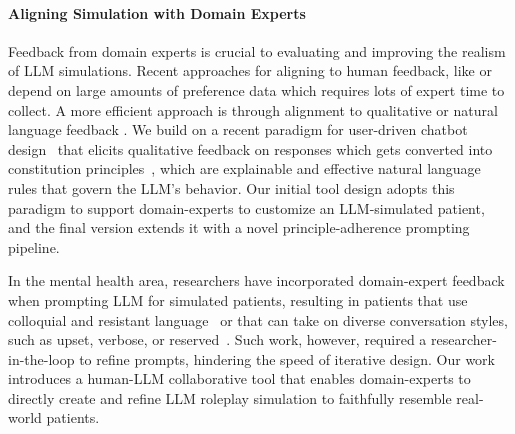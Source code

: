 \documentclass[11pt]{article}
\begin{document}
\paragraph{Aligning Simulation with Domain Experts}
Feedback from domain experts is crucial to evaluating and improving the realism of LLM simulations. Recent approaches for aligning to human feedback, like \citet{christiano2017deep} or \citet{rafailov2024direct} depend on large amounts of preference data which requires lots of expert time to collect. A more efficient approach is through alignment to qualitative or natural language feedback \cite{shi2022life}. 
We build on a recent paradigm for user-driven chatbot design~\cite{petridis2023constitutionmaker} that elicits qualitative feedback on responses which gets converted into constitution principles~\cite{bai2022constitutional}, which are explainable and effective natural language rules that govern the LLM's behavior.
Our initial tool design adopts this paradigm to support domain-experts to customize an LLM-simulated patient,
and the final version extends it with a novel principle-adherence prompting pipeline.

In the mental health area, researchers have incorporated domain-expert feedback when prompting LLM for simulated patients, resulting in patients that use colloquial and resistant language~\cite{chen2023llmempowered, stapleton2023seeing} or that can take on diverse conversation styles, such as upset, verbose, or reserved~\cite{wang2024patient}. 
Such work, however, required a researcher-in-the-loop to refine prompts, hindering the speed of iterative design.
Our work introduces a human-LLM collaborative tool that enables domain-experts to directly create and refine LLM roleplay simulation to faithfully resemble real-world patients.
\end{document}
